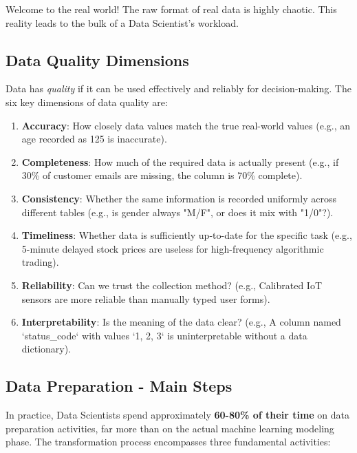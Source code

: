 Welcome to the real world! The raw format of real data is highly chaotic. This reality leads to the bulk of a Data Scientist's workload.

\subsection{Data Quality Dimensions}

Data has \textit{quality} if it can be used effectively and reliably for decision-making. The six key dimensions of data quality are:

\begin{enumerate}
    \item \textbf{Accuracy}: How closely data values match the true real-world values (e.g., an age recorded as 125 is inaccurate).
    \item \textbf{Completeness}: How much of the required data is actually present (e.g., if 30\% of customer emails are missing, the column is 70\% complete).
    \item \textbf{Consistency}: Whether the same information is recorded uniformly across different tables (e.g., is gender always "M/F", or does it mix with "1/0"?).
    \item \textbf{Timeliness}: Whether data is sufficiently up-to-date for the specific task (e.g., 5-minute delayed stock prices are useless for high-frequency algorithmic trading).
    \item \textbf{Reliability}: Can we trust the collection method? (e.g., Calibrated IoT sensors are more reliable than manually typed user forms).
    \item \textbf{Interpretability}: Is the meaning of the data clear? (e.g., A column named `status\_code` with values `1, 2, 3` is uninterpretable without a data dictionary).
\end{enumerate}

\subsection{Data Preparation - Main Steps}

In practice, Data Scientists spend approximately \textbf{60-80\% of their time} on data preparation activities, far more than on the actual machine learning modeling phase. The transformation process encompasses three fundamental activities:

